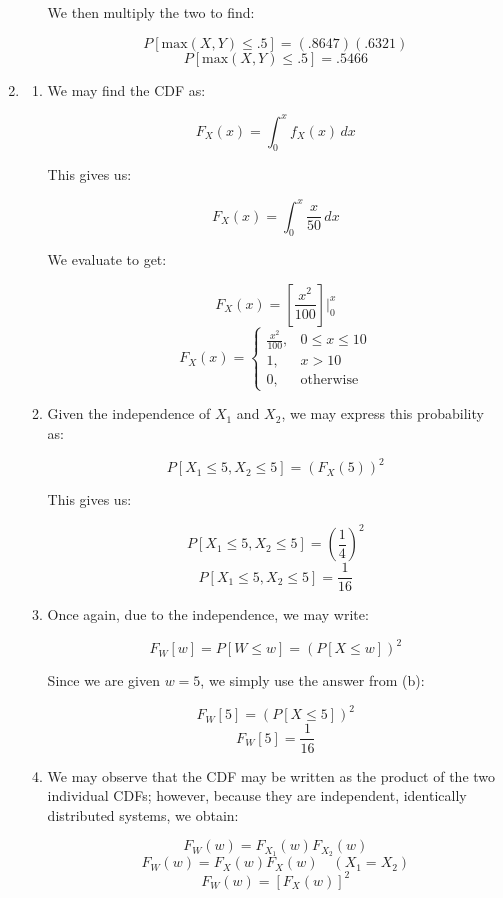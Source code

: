 \begin{enumerate}
\begin{enumerate}
        We then multiply the two to find:

        $$P[\text{max}(X,Y)\leq .5]=(.8647)(.6321)$$
        $$\boxed{P[\text{max}(X,Y)\leq .5]=.5466}$$

    \end{enumerate}

  \item

    \begin{enumerate}

      \item We may find the CDF as:

        $$F_X(x)=\int_0^x f_X(x)\,dx$$

        This gives us:

        $$F_X(x)=\int_0^x \frac{x}{50}\,dx$$

        We evaluate to get:

        $$F_X(x)=\left[ \frac{x^2}{100} \right]\Big|_0^x$$
        $$\boxed{F_X(x)=\left\{\begin{array}{ll} \frac{x^2}{100},& 0\leq x\leq 10\\ 1,& x>10\\ 0, & \text{otherwise}\end{array}}$$

      \item Given the independence of $X_1$ and $X_2$, we may express this probability as:

        $$P[X_1\leq 5, X_2\leq 5]=\left( F_X(5) \right)^2$$

        This gives us:

        $$P[X_1\leq 5, X_2\leq 5]=\left( \frac{1}{4} \right)^2$$
        $$\boxed{P[X_1\leq 5, X_2\leq 5]=\frac{1}{16}}$$

      \item Once again, due to the independence, we may write:

        $$F_W[w]=P[W\leq w]=\left(P[X \leq w]\right)^2$$

        Since we are given $w=5$, we simply use the answer from (b):

        $$F_W[5]=\left(P[X \leq 5]\right)^2$$
        $$\boxed{F_W[5]=\frac{1}{16}}$$

      \item We may observe that the CDF may be written as the product of the two individual CDFs; however, because they are independent, identically distributed systems, we obtain:

        $$F_W(w)=F_{X_1}(w)F_{X_2}(w)$$
        $$F_W(w)=F_{X}(w)F_{X}(w)\quad (X_1=X_2)$$
        $$F_W(w)=[F_{X}(w)]^2$$


\end{enumerate}
\end{enumerate}
